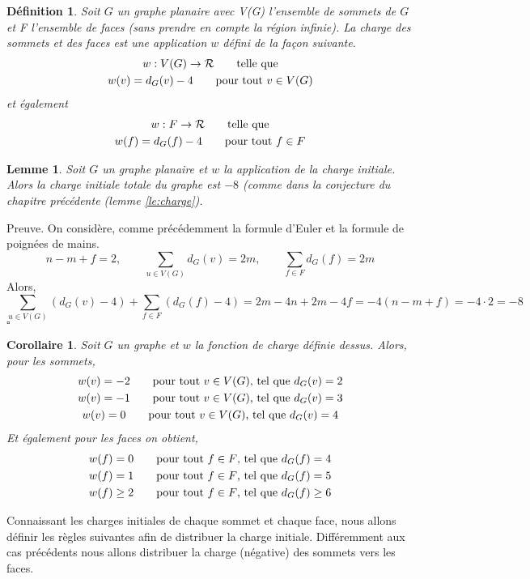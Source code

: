 \documentclass[10pt,a4paper]{article}
\newtheorem{definition}{Définition}
\newtheorem{lemme}{Lemme}
\newtheorem{corollaire}{Corollaire}
\newcommand{\ep}{{\hfill $\square$}}
\begin{document}
\begin{definition}
Soit $G$ un graphe planaire avec V(G) l'ensemble de sommets de $G$ et F l'ensemble de faces (sans prendre en compte la région infinie). La \emph{charge} des sommets et des faces est une application $w$ défini de la façon suivante.
$$
\gathered
w: V(G) \to \mathcal{R} \qquad \textrm{telle que}\\
w(v) = d_G(v) - 4 \qquad \textrm{pour tout $v \in V(G)$}\\
\endgathered
$$
et également
$$
\gathered
w: F \to \mathcal{R} \qquad \textrm{telle que}\\
w(f) = d_G(f) - 4 \qquad \textrm{pour tout $f \in F$}\\
\endgathered
$$
\end{definition}

\begin{lemme}
Soit $G$ un graphe planaire et $w$ la application de la charge initiale. Alors la charge initiale totale du graphe est $-8$ (comme dans la conjecture du chapitre précédente (lemme \ref{le:charge}).
\end{lemme}

Preuve.
On considère, comme précédemment la formule d'Euler et la formule de poignées de mains.
$$
n - m + f = 2, \qquad \sum_{u \in V(G)} d_G(v) = 2m, \qquad \sum_{f \in F} d_G(f) = 2m
$$
Alors,
$$
\sum_{u \in V(G)} (d_G(v) - 4) + \sum_{f \in F} (d_G(f) - 4) = 2m - 4n + 2m - 4f = -4( n - m + f) = -4 \cdot 2 = -8
$$
\ep

\begin{corollaire}
Soit $G$ un graphe et $w$ la fonction de charge définie dessus. Alors, pour les sommets,
$$
\gathered
w(v) = -2 \qquad \textrm{pour tout $v \in V(G)$, tel que  } d_G(v) = 2\\
w(v) = -1 \qquad \textrm{pour tout $v \in V(G)$, tel que  } d_G(v) = 3\\
w(v) = 0 \qquad \textrm{pour tout $v \in V(G)$, tel que  } d_G(v) = 4
\endgathered
$$
Et également pour les faces on obtient,
$$
\gathered
w(f) = 0 \qquad \textrm{pour tout $f \in F$, tel que  } d_G(f) = 4\\
w(f) = 1 \qquad \textrm{pour tout $f \in F$, tel que  } d_G(f) = 5\\
w(f) \geq 2 \qquad \textrm{pour tout $f \in F$, tel que  } d_G(f) \geq 6
\endgathered
$$
\end{corollaire}

Connaissant les charges initiales de chaque sommet et chaque face, nous allons définir les règles suivantes afin de distribuer la charge initiale. Différemment aux cas précédents nous allons distribuer la charge (négative) des sommets vers les faces.
\end{document}
